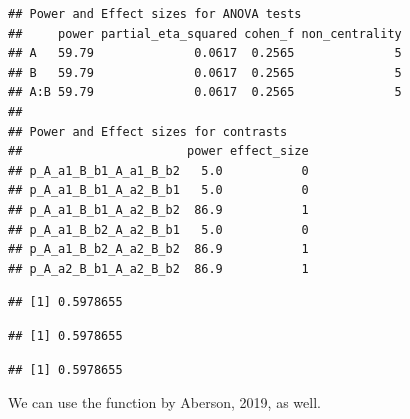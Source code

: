 \documentclass[]{book}
\newenvironment{Shaded}{\begin{snugshade}}{\end{snugshade}}
\newcommand{\CommentTok}[1]{\textcolor[rgb]{0.56,0.35,0.01}{\textit{#1}}}
\newcommand{\KeywordTok}[1]{\textcolor[rgb]{0.13,0.29,0.53}{\textbf{#1}}}
\newcommand{\NormalTok}[1]{#1}
\newcommand{\OperatorTok}[1]{\textcolor[rgb]{0.81,0.36,0.00}{\textbf{#1}}}
\newcommand{\StringTok}[1]{\textcolor[rgb]{0.31,0.60,0.02}{#1}}
\begin{document}
\begin{verbatim}
## Power and Effect sizes for ANOVA tests
##     power partial_eta_squared cohen_f non_centrality
## A   59.79              0.0617  0.2565              5
## B   59.79              0.0617  0.2565              5
## A:B 59.79              0.0617  0.2565              5
## 
## Power and Effect sizes for contrasts
##                       power effect_size
## p_A_a1_B_b1_A_a1_B_b2   5.0           0
## p_A_a1_B_b1_A_a2_B_b1   5.0           0
## p_A_a1_B_b1_A_a2_B_b2  86.9           1
## p_A_a1_B_b2_A_a2_B_b1   5.0           0
## p_A_a1_B_b2_A_a2_B_b2  86.9           1
## p_A_a2_B_b1_A_a2_B_b2  86.9           1
\end{verbatim}

\begin{Shaded}
\end{Shaded}

\begin{verbatim}
## [1] 0.5978655
\end{verbatim}

\begin{Shaded}
\end{Shaded}

\begin{verbatim}
## [1] 0.5978655
\end{verbatim}

\begin{Shaded}
\end{Shaded}

\begin{verbatim}
## [1] 0.5978655
\end{verbatim}

We can use the function by Aberson, 2019, as well.
\end{document}
